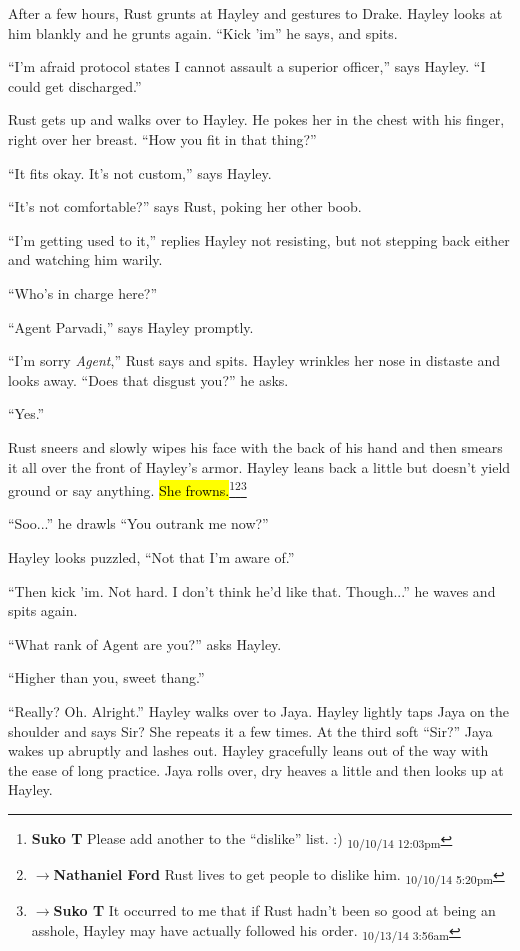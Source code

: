 After a few hours, Rust grunts at Hayley and gestures to Drake.   Hayley looks at him blankly and he grunts again.  ``Kick 'im'' he says, and spits.

``I'm afraid protocol states I cannot assault a superior officer,'' says Hayley.  ``I could get discharged.''

Rust gets up and walks over to Hayley.  He pokes her in the chest with his finger, right over her breast.  ``How you fit in that thing?''

``It fits okay.  It's not custom,'' says Hayley.

``It's not comfortable?'' says Rust, poking her other boob.

``I'm getting used to it,'' replies Hayley not resisting, but not stepping back either and watching him warily.

``Who's in charge here?''

``Agent Parvadi,'' says Hayley promptly.

``I'm sorry \textit{Agent},'' Rust says and spits.  Hayley wrinkles her nose in distaste and looks away.  ``Does that disgust you?'' he asks.

``Yes.''

Rust sneers and slowly wipes his face with the back of his hand and then smears it all over the front of Hayley's armor.  Hayley leans back a little but doesn't yield ground or say anything.  \hl{She frowns.}\footnote{\textbf{Suko T }Please add another to the ``dislike'' list. :) \textsubscript{10/10/14 12:03pm}}\footnote{$\rightarrow$\textbf{Nathaniel Ford }Rust lives to get people to dislike him. \textsubscript{10/10/14 5:20pm}}\footnote{$\rightarrow$\textbf{Suko T }It occurred to me that if Rust hadn't been so good at being an asshole, Hayley may have actually followed his order. \textsubscript{10/13/14 3:56am}}

``Soo...'' he drawls ``You outrank me now?''

Hayley looks puzzled, ``Not that I'm aware of.''

``Then kick 'im.  Not hard.  I don't think he'd like that.  Though...''  he waves and spits again.

``What rank of Agent are you?'' asks Hayley.

``Higher than you, sweet thang.''

``Really?  Oh.  Alright.''  Hayley walks over to Jaya.  Hayley lightly taps Jaya on the shoulder and says Sir?  She repeats it a few times.  At the third soft ``Sir?'' Jaya wakes up abruptly and lashes out.  Hayley gracefully leans out of the way with the ease of long practice.  Jaya rolls over, dry heaves a little and then looks up at Hayley.

